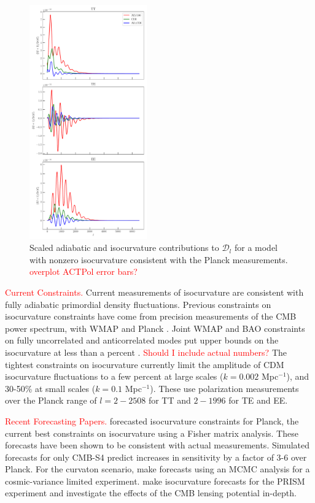 \documentclass{emulateapj}
\newcommand\writingnote[1]{\textcolor{red}{#1}}
\begin{document}
\begin{figure}[h]
\includegraphics[width=0.45\textwidth]{figures/isocurvature_fiducial_spectra_contributions.pdf}
\caption{Scaled adiabatic and isocurvature contributions to $\mathcal{D}_l$ for a model with nonzero isocurvature consistent with the Planck measurements. \writingnote{overplot ACTPol error bars?}\label{fig:effects}}
\end{figure}


\writingnote{Current Constraints.}
Current measurements of isocurvature are consistent with fully adiabatic primordial density fluctuations. Previous constraints on isocurvature constraints have come from precision measurements of the CMB power spectrum, with WMAP \citep{moodley/etal:2004} and Planck \citep{planckXXII:2013}. Joint WMAP and BAO constraints on fully uncorrelated and anticorrelated modes put upper bounds on the isocurvature at less than a percent \citep{hinshaw/etal:2013}. \writingnote{Should I include actual numbers?} The tightest constraints on isocurvature \citep{planckXX:2015} currently limit the amplitude of CDM isocurvature fluctuations to a few percent at large scales ($k=0.002$ Mpc$^{-1}$), and 30-50\% at small scales ($k=0.1$ Mpc$^{-1}$). These use polarization measurements over the Planck range of $l=2-2508$ for TT and $2-1996$ for TE and EE.


\writingnote{Recent Forecasting Papers.}
\cite{bucher/etal:2001} forecasted isocurvature constraints for Planck, the current best constraints on isocurvature using a Fisher matrix analysis. These forecasts have been shown to be consistent with actual measurements. Simulated forecasts for only CMB-S4 \citep{CMB-S4:2016} predict increases in sensitivity by a factor of 3-6 over Planck. For the curvaton scenario, \cite{smith/grin:2016} make forecasts using an MCMC analysis for a cosmic-variance limited experiment. \cite{kasanda/moodley:2014} make isocurvature forecasts for the PRISM experiment and investigate the effects of the CMB lensing potential in-depth.
\end{document}
